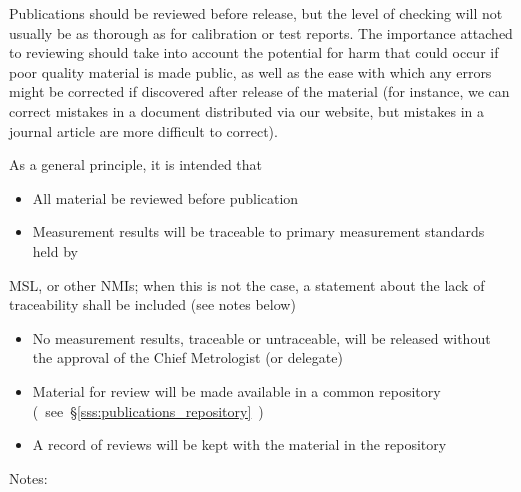 Publications should be reviewed before release, but the level of checking will not usually be as thorough as for calibration or test reports. The importance attached to reviewing should take into account the potential for harm that could occur if poor quality material is made public, as well as the ease with which any errors might be corrected if discovered after release of the material (for instance, we can correct mistakes in a document distributed via our website, but mistakes in a journal article are more difficult to correct).  

As a general principle, it is intended that
\begin{itemize}
\item  All material be reviewed before publication
\item  Measurement results will be traceable to primary measurement standards held by 
\end{itemize}
MSL, or other NMIs; when this is not the case, a statement about the lack of traceability shall be included (see notes below)
\begin{itemize}
\item  No measurement results, traceable or untraceable, will be released without the approval of the Chief Metrologist (or delegate) 
\item  Material for review will be made available in a common repository (~see~\S\ref{sss:publications_repository}~)
\item  A record of reviews will be kept with the material in the repository 
\end{itemize}
Notes: 
